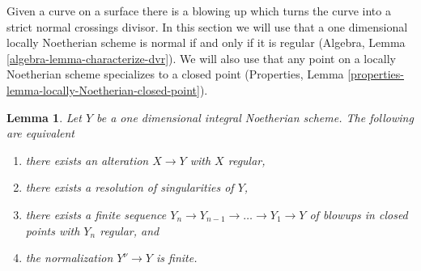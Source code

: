\documentclass{stacks-project}
\theoremstyle{plain}
\newtheorem{lemma}[subsection]{Lemma}
\theoremstyle{definition}
\theoremstyle{remark}
\numberwithin{equation}{subsection}
\begin{document}
\noindent
Given a curve on a surface there is a blowing up which turns the
curve into a strict normal crossings divisor. In this section we
will use that a one dimensional locally Noetherian scheme is normal if
and only if it is regular
(Algebra, Lemma \ref{algebra-lemma-characterize-dvr}).
We will also use that any point on a locally Noetherian
scheme specializes to a closed point
(Properties, Lemma \ref{properties-lemma-locally-Noetherian-closed-point}).

\begin{lemma}
\label{lemma-resolve-curve}
Let $Y$ be a one dimensional integral Noetherian scheme.
The following are equivalent
\begin{enumerate}
\item there exists an alteration $X \to Y$ with $X$ regular,
\item there exists a resolution of singularities of $Y$,
\item there exists a finite sequence
$Y_n \to Y_{n - 1} \to \ldots \to Y_1 \to Y$ of blowups
in closed points with $Y_n$ regular, and
\item the normalization $Y^\nu \to Y$ is finite.
\end{enumerate}
\end{lemma}
\end{document}
